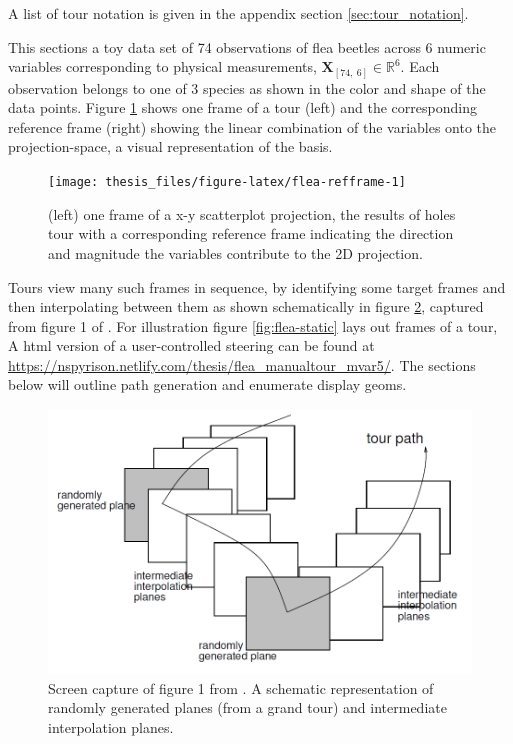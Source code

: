 \documentclass{monashthesis}
\begin{document}
A list of tour notation is given in the appendix section
\ref{sec:tour_notation}.

This sections a toy data set of 74 observations of flea beetles across 6
numeric variables corresponding to physical measurements,
\(\textbf{X}_{[74,~6]} \in \mathbb{R}^{6}\). Each observation belongs to
one of 3 species as shown in the color and shape of the data points.
Figure \ref{fig:flea-refframe} shows one frame of a tour (left) and the
corresponding reference frame (right) showing the linear combination of
the variables onto the projection-space, a visual representation of the
basis.

\begin{figure}

{\centering \texttt{[image: thesis\_files/figure-latex/flea-refframe-1]} 

}

\caption{(left) one frame of a x-y scatterplot projection, the results of holes tour with a corresponding reference frame indicating the direction and magnitude the variables contribute to the 2D projection.}\label{fig:flea-refframe}
\end{figure}

Tours view many such frames in sequence, by identifying some target
frames and then interpolating between them as shown schematically in
figure \ref{fig:buja05fig}, captured from figure 1 of
\textcite{buja_computational_2005}. For illustration figure
\ref{fig:flea-static} lays out frames of a tour, A html version of a
user-controlled steering can be found at
\url{https://nspyrison.netlify.com/thesis/flea_manualtour_mvar5/}. The
sections below will outline path generation and enumerate display geoms.






\begin{figure}

{\centering \includegraphics[width=0.7\linewidth]{./figures/buja05fig} 

}

\caption{Screen capture of figure 1 from
\textcite{buja_computational_2005}. A schematic representation of
randomly generated planes (from a grand tour) and intermediate
interpolation planes.}\label{fig:buja05fig}
\end{figure}
\end{document}
